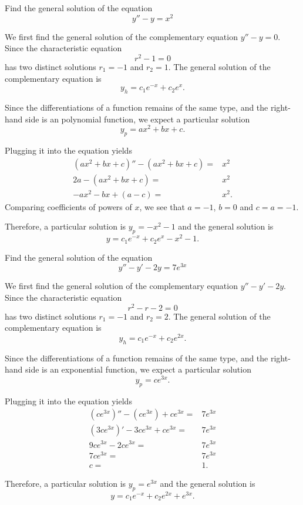 \begin{example}
  Find the general solution of the equation
  \[y'' - y = x^2\]
\end{example}
\begin{solution}
  We first find the general solution of the complementary equation $y''- y=0$.
  Since the characteristic equation
  \[r^2-1=0\]
has two distinct solutions $r_1=-1$ and $r_2=1$. The general solution of the complementary equation is
\[y_h=c_1e^{-x}+c_2e^{x}.\]

Since the differentiations of a function remains of the same type, and the right-hand side is an polynomial function, we expect a particular solution
\[y_p=ax^2+bx+c.\]

Plugging it into the equation yields
\[
\begin{aligned}
  (ax^2+bx+c)''-(ax^2+bx+c)=& x^2\\
  2a - (ax^2+bx+c) =& x^2\\
  -ax^2-bx+(a-c)=& x^2.
\end{aligned}  
\]
Comparing coefficients of powers of $x$, we see that $a=-1$, $b=0$ and $c=a=-1$.

Therefore, a particular solution is $y_p=-x^2-1$ and the general solution is
\[
y= c_1e^{-x}+c_2e^{x}-x^2-1. 
\]
\end{solution}

\begin{example}
  Find the general solution of the equation
  \[y'' - y' - 2y = 7 e^{3x}\]
\end{example}
\begin{solution}
  We first find the general solution of the complementary equation $y'' - y' - 2y$.
  Since the characteristic equation
  \[r^2-r-2=0\]
has two distinct solutions $r_1=-1$ and $r_2=2$. The general solution of the complementary equation is
\[y_h=c_1e^{-x}+c_2e^{2x}.\]

Since the differentiations of a function remains of the same type, and the right-hand side is an exponential function, we expect a particular solution
\[y_p=ce^{3x}.\]

Plugging it into the equation yields
\[
\begin{aligned}
  (ce^{3x})''-(ce^{3x})+ce^{3x}=&7e^{3x}\\
  (3ce^{3x})'-3ce^{3x}+ce^{3x}=&7e^{3x}\\
  9ce^{3x}-2ce^{3x}=&7e^{3x}\\
  7ce^{3x}=&7e^{3x}\\
  c=&1.
\end{aligned}  
\]

Therefore, a particular solution is $y_p=e^{3x}$ and the general solution is
\[
y= c_1e^{-x}+c_2e^{2x}+e^{3x}. 
\]
\end{solution}

